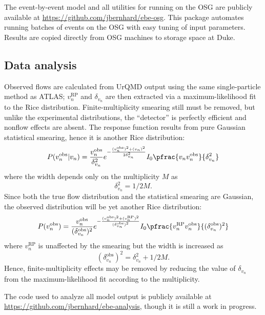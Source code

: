 \documentclass[reprint,amsmath]{revtex4-1}
\begin{document}
The event-by-event model and all utilities for running on the OSG are publicly available at \url{https://github.com/jbernhard/ebe-osg}.
This package automates running batches of events on the OSG with easy tuning of input parameters.  Results are copied directly from OSG
machines to storage space at Duke.


\subsection{Data analysis}

Observed flows are calculated from UrQMD output using the same single-particle method as ATLAS; $v_n^\text{RP}$ and $\delta_{v_n}$ are then
extracted via a maximum-likelihood fit to the Rice distribution.  Finite-multiplicity smearing still must be removed, but unlike the
experimental distributions, the ``detector'' is perfectly efficient and nonflow effects are absent.  The response function results from pure
Gaussian statistical smearing, hence it is another Rice distribution:
\begin{equation}
  P(v_n^\text{obs}|v_n) = \frac{v_n^\text{obs}}{\delta_{v_n}^2} e^{ -\frac{(v_n^\text{obs})^2 + (v_n)^2}{2\delta_{v_n}^2} }
    I_0 \pfrac{v_nv_n^\text{obs}}{\delta_{v_n}^2}
\end{equation}
where the width depends only on the multiplicity $M$ as \cite{ollitrault,phobos,atlas-vn2}
\begin{equation}
  \delta_{v_n}^2 = 1/2M.
\end{equation}
Since both the true flow distribution and the statistical smearing are Gaussian, the observed distribution will be yet another Rice
distribution:
\begin{equation}
  P(v_n^\text{obs}) = \frac{v_n^\text{obs}}{(\delta_{v_n}^\text{obs})^2} e^{ -\frac{(v_n^\text{obs})^2 +
  (v_n^\text{RP})^2}{(\delta_{v_n}^\text{obs})^2} } I_0 \pfrac{v_n^\text{RP}v_n^\text{obs}}{(\delta_{v_n}^\text{obs})^2}
\end{equation}
where $v_n^\text{RP}$ is unaffected by the smearing but the width is increased as
\begin{equation}
  (\delta_{v_n}^\text{obs})^2 = \delta_{v_n}^2 + 1/2M.
\end{equation}
Hence, finite-multiplicity effects may be removed by reducing the value of $\delta_{v_n}$ from the maximum-likelihood fit according to the
multiplicity.

The code used to analyze all model output is publicly available at \url{https://github.com/jbernhard/ebe-analysis}, though it is still a
work in progress.
\end{document}
